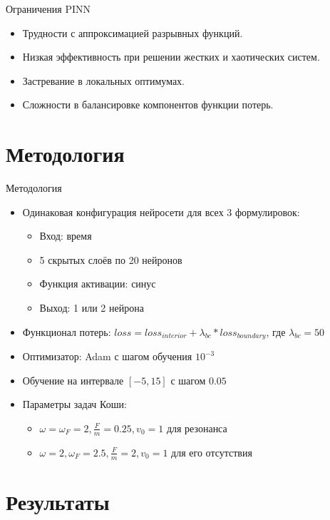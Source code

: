 \documentclass{beamer}
\begin{document}
\begin{frame}{Ограничения PINN}
    \begin{itemize}
        \item Трудности с аппроксимацией разрывных функций.
        \item Низкая эффективность при решении жестких и хаотических систем.
        \item Застревание в локальных оптимумах.
        \item Сложности в балансировке компонентов функции потерь.
    \end{itemize}
\end{frame}

\section{Методология}
\begin{frame}{Методология}
    \begin{itemize}
        \item Одинаковая конфигурация нейросети для всех 3 формулировок:
        \begin{itemize}
            \item Вход: время
            \item 5 скрытых слоёв по 20 нейронов
            \item Функция активации: синус
            \item Выход: 1 или 2 нейрона
        \end{itemize}
        \item Функционал потерь: $loss = loss_{interior} + \lambda_{bc} * loss_{boundary}$, где $\lambda_{bc} = 50$
        \item Оптимизатор: Adam с шагом обучения $10^{-3}$
        \item Обучение на интервале $[-5, 15]$ с шагом $0.05$
        \item Параметры задач Коши:
        \begin{itemize}
            \item $\omega = \omega_F = 2, \frac{F}{m} = 0.25, v_0 = 1$ для резонанса
            \item $\omega = 2, \omega_F = 2.5, \frac{F}{m} = 2, v_0 = 1$ для его отсутствия
        \end{itemize}
    \end{itemize}
\end{frame}

\section{Результаты}
\end{document}
